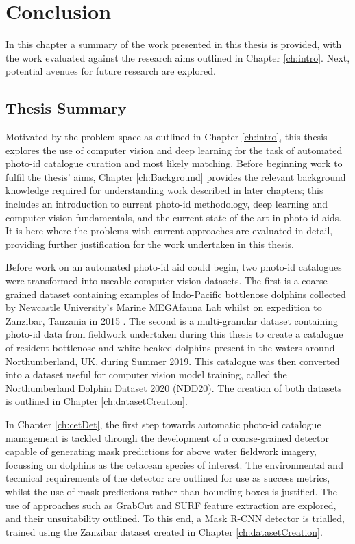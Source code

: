 \chapter{Conclusion}\label{ch:Conclusion}

In this chapter a summary of the work presented in this thesis is provided, with the work evaluated against the research aims outlined in Chapter \ref{ch:intro}. Next, potential avenues for future research are explored. 

\section{Thesis Summary}\label{ch:Conclusion,sec:Summary}

Motivated by the problem space as outlined in Chapter \ref{ch:intro}, this thesis explores the use of computer vision and deep learning for the task of automated photo-id catalogue curation and most likely matching. Before beginning work to fulfil the thesis' aims, Chapter \ref{ch:Background} provides the relevant background knowledge required for understanding work described in later chapters; this includes an introduction to current photo-id methodology, deep learning and computer vision fundamentals, and the current state-of-the-art in photo-id aids. It is here where the problems with current approaches are evaluated in detail, providing further justification for the work undertaken in this thesis. 

Before work on an automated photo-id aid could begin, two photo-id catalogues were transformed into useable computer vision datasets. The first is a coarse-grained dataset containing examples of Indo-Pacific bottlenose dolphins collected by Newcastle University's Marine MEGAfauna Lab whilst on expedition to Zanzibar, Tanzania in 2015 \cite{sharpe_indian_2019}. The second is a multi-granular dataset containing photo-id data from fieldwork undertaken during this thesis to create a catalogue of resident bottlenose and white-beaked dolphins present in the waters around Northumberland, UK, during Summer 2019. This catalogue was then converted into a dataset useful for computer vision model training, called the Northumberland Dolphin Dataset 2020 (NDD20). The creation of both datasets is outlined in Chapter \ref{ch:datasetCreation}.

In Chapter \ref{ch:cetDet}, the first step towards automatic photo-id catalogue management is tackled through the development of a coarse-grained detector capable of generating mask predictions for above water fieldwork imagery, focussing on dolphins as the cetacean species of interest. The environmental and technical requirements of the detector are outlined for use as success metrics, whilst the use of mask predictions rather than bounding boxes is justified. The use of approaches such as GrabCut \cite{rother_grabcut_2004} and SURF feature extraction \cite{bay_speeded-up_2008} are explored, and their unsuitability outlined. To this end, a Mask R-CNN \cite{he_mask_2017} detector is trialled, trained using the Zanzibar dataset created in Chapter \ref{ch:datasetCreation}. 

